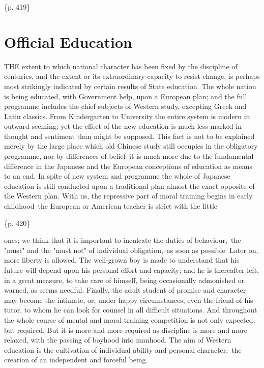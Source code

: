 \{p. 419\}

\section{Official Education}
\label{sec:org01c7926}

THE extent to which national character has been fixed by the discipline of centuries, and the extent or its extraordinary capacity to resist change, is perhaps most strikingly indicated by certain results of State education. The whole nation is being educated, with Government help, upon a European plan; and the full programme includes the chief subjects of Western study, excepting Greek and Latin classics. From Kindergarten to University the entire system is modern in outward seeming; yet the effect of the new education is much less marked in thought and sentiment than might be supposed. This fact is not to be explained merely by the large place which old Chinese study still occupies in the obligatory programme, nor by differences of belief--it is much more due to the fundamental difference in the Japanese and the European conceptions of education as means to an end. In spite of new system and programme the whole of Japanese education is still conducted upon a traditional plan almost the exact opposite of the Western plan. With us, the repressive part of moral training begins in early childhood--the European or American teacher is strict with the little

\{p. 420\}

ones; we think that it is important to inculcate the duties of behaviour,--the "must" and the "must not" of individual obligation,--as soon as possible. Later on, more liberty is allowed. The well-grown boy is made to understand that his future will depend upon his personal effort and capacity; and he is thereafter left, in a great measure, to take care of himself, being occasionally admonished or warned, as seems needful. Finally, the adult student of promise and character may become the intimate, or, under happy circumstances, even the friend of his tutor, to whom he can look for counsel in all difficult situations. And throughout the whole course of mental and moral training competition is not only expected, but required. But it is more and more required as discipline is more and more relaxed, with the passing of boyhood into manhood. The aim of Western education is the cultivation of individual ability and personal character,--the creation of an independent and forceful being.

